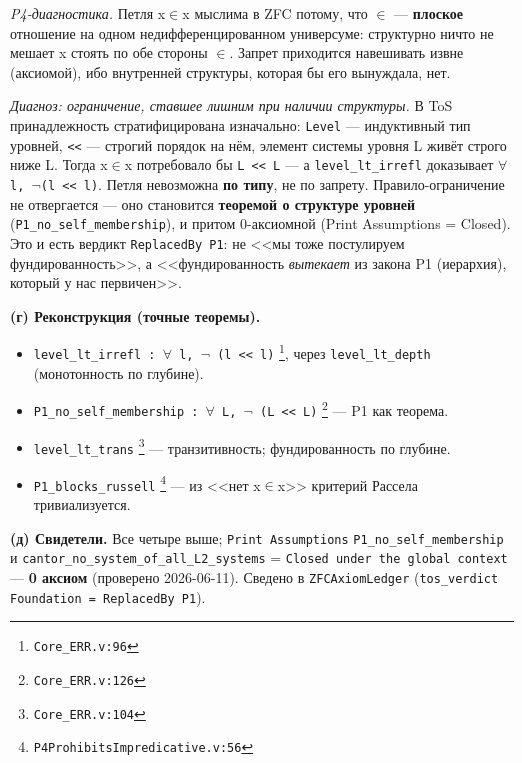 \documentclass[11pt,a4paper]{article}
\begin{document}
\emph{P4-диагностика.} Петля x$\in$x мыслима в ZFC потому, что $\in$ --- \textbf{плоское} отношение на одном недифференцированном универсуме: структурно ничто не мешает x стоять по обе стороны $\in$. Запрет приходится навешивать извне (аксиомой), ибо внутренней структуры, которая бы его вынуждала, нет.

\emph{Диагноз: ограничение, ставшее лишним при наличии структуры.} В ToS принадлежность стратифицирована изначально: \texttt{Level} --- индуктивный тип уровней, \texttt{<<} --- строгий порядок на нём, элемент системы уровня L живёт строго ниже L. Тогда x$\in$x потребовало бы \texttt{L << L} --- а \texttt{level\_\allowbreak{}lt\_\allowbreak{}irrefl} доказывает \texttt{$\forall$ l,\allowbreak{} $\neg$(l << l)}. Петля невозможна \textbf{по типу}, не по запрету. Правило-ограничение не отвергается --- оно становится \textbf{теоремой о структуре уровней} (\texttt{P1\_\allowbreak{}no\_\allowbreak{}self\_\allowbreak{}membership}), и притом 0-аксиомной (Print Assumptions = Closed). Это и есть вердикт \texttt{Replaced\allowbreak{}By P1}: не <<мы тоже постулируем фундированность>>, а <<фундированность \emph{вытекает} из закона P1 (иерархия), который у нас первичен>>.

\textbf{(г) Реконструкция (точные теоремы).}
\begin{itemize}
\item \texttt{level\_\allowbreak{}lt\_\allowbreak{}irrefl : $\forall$ l,\allowbreak{} $\neg$ (l << l)} \footnote{\texttt{Core\_\allowbreak{}ERR.v:96}}, через \texttt{level\_\allowbreak{}lt\_\allowbreak{}depth} (монотонность по глубине).
\item \texttt{P1\_\allowbreak{}no\_\allowbreak{}self\_\allowbreak{}membership : $\forall$ L,\allowbreak{} $\neg$ (L << L)} \footnote{\texttt{Core\_\allowbreak{}ERR.v:126}} --- P1 как теорема.
\item \texttt{level\_\allowbreak{}lt\_\allowbreak{}trans} \footnote{\texttt{Core\_\allowbreak{}ERR.v:104}} --- транзитивность; фундированность по глубине.
\item \texttt{P1\_\allowbreak{}blocks\_\allowbreak{}russell} \footnote{\texttt{P4Prohibits\allowbreak{}Impredicative.v:56}} --- из <<нет x$\in$x>> критерий Рассела тривиализуется.
\end{itemize}

\textbf{(д) Свидетели.} Все четыре выше; \texttt{Print Assumptions} \texttt{P1\_\allowbreak{}no\_\allowbreak{}self\_\allowbreak{}membership} и \texttt{cantor\_\allowbreak{}no\_\allowbreak{}system\_\allowbreak{}of\_\allowbreak{}all\_\allowbreak{}L2\_\allowbreak{}systems} = \texttt{Closed under the global context} --- \textbf{0 аксиом} (проверено 2026-06-11). Сведено в \texttt{ZFCAxiom\allowbreak{}Ledger} (\texttt{tos\_\allowbreak{}verdict Foundation = Replaced\allowbreak{}By P1}).
\end{document}

